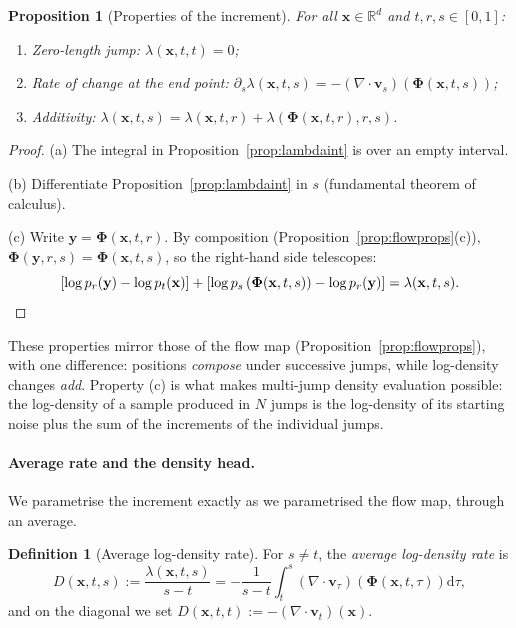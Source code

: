 \documentclass[11pt,a4paper]{article}
\numberwithin{equation}{section}     %
\theoremstyle{plain}        %
\newtheorem{proposition}[theorem]{Proposition}
\theoremstyle{definition}   %
\newtheorem{definition}[theorem]{Definition}
\theoremstyle{remark}       %
\begin{document}
\begin{proposition}[Properties of the increment]\label{prop:lambdaprops}
For all $\mathbf{x}\in\mathbb{R}^d$ and $t,r,s\in[0,1]$:
\begin{enumerate}[label=(\alph*)]
\item \emph{Zero-length jump:} $\lambda(\mathbf{x},t,t)=0$;
\item \emph{Rate of change at the end point:} $\partial_s\lambda(\mathbf{x},t,s)=-\left(\nabla\cdot\mathbf{v}_s\right)\left(\boldsymbol{\Phi}(\mathbf{x},t,s)\right)$;
\item \emph{Additivity:} $\lambda(\mathbf{x},t,s)=\lambda(\mathbf{x},t,r)+\lambda\left(\boldsymbol{\Phi}(\mathbf{x},t,r),r,s\right)$.
\end{enumerate}
\end{proposition}

\begin{proof}
(a) The integral in Proposition~\ref{prop:lambdaint} is over an empty interval.

(b) Differentiate Proposition~\ref{prop:lambdaint} in $s$ (fundamental theorem of calculus).

(c) Write $\mathbf{y}=\boldsymbol{\Phi}(\mathbf{x},t,r)$. By composition (Proposition~\ref{prop:flowprops}(c)), $\boldsymbol{\Phi}(\mathbf{y},r,s)=\boldsymbol{\Phi}(\mathbf{x},t,s)$, so the right-hand side telescopes:
\[
\left[\log p_r(\mathbf{y})-\log p_t(\mathbf{x})\right]+\left[\log p_s\left(\boldsymbol{\Phi}(\mathbf{x},t,s)\right)-\log p_r(\mathbf{y})\right]=\lambda(\mathbf{x},t,s). \qedhere
\]
\end{proof}

These properties mirror those of the flow map (Proposition~\ref{prop:flowprops}), with one difference: positions \emph{compose} under successive jumps, while log-density changes \emph{add}. Property (c) is what makes multi-jump density evaluation possible: the log-density of a sample produced in $N$ jumps is the log-density of its starting noise plus the sum of the increments of the individual jumps.

\paragraph{Average rate and the density head.} We parametrise the increment exactly as we parametrised the flow map, through an average.

\begin{definition}[Average log-density rate]\label{def:avgrate}
For $s\neq t$, the \emph{average log-density rate} is
\[
D(\mathbf{x},t,s):=\frac{\lambda(\mathbf{x},t,s)}{s-t}=-\frac{1}{s-t}\int_t^s\left(\nabla\cdot\mathbf{v}_\tau\right)\left(\boldsymbol{\Phi}(\mathbf{x},t,\tau)\right)\mathrm{d}\tau ,
\]
and on the diagonal we set $D(\mathbf{x},t,t):=-\left(\nabla\cdot\mathbf{v}_t\right)(\mathbf{x})$.
\end{definition}
\end{document}
